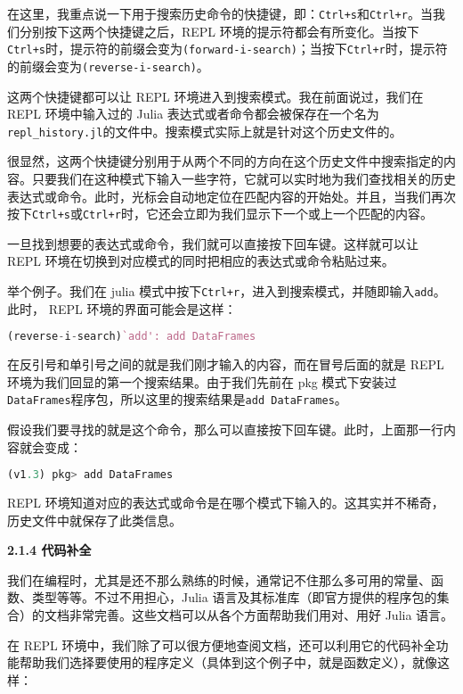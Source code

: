 在这里，我重点说一下用于搜索历史命令的快捷键，即：\verb`Ctrl+s`和\verb`Ctrl+r`。当我们分别按下这两个快捷键之后，REPL 环境的提示符都会有所变化。当按下\verb`Ctrl+s`时，提示符的前缀会变为\verb`(forward-i-search)`；当按下\verb`Ctrl+r`时，提示符的前缀会变为\verb`(reverse-i-search)`。

这两个快捷键都可以让 REPL 环境进入到搜索模式。我在前面说过，我们在 REPL 环境中输入过的 Julia 表达式或者命令都会被保存在一个名为\verb`repl_history.jl`的文件中。搜索模式实际上就是针对这个历史文件的。

很显然，这两个快捷键分别用于从两个不同的方向在这个历史文件中搜索指定的内容。只要我们在这种模式下输入一些字符，它就可以实时地为我们查找相关的历史表达式或命令。此时，光标会自动地定位在匹配内容的开始处。并且，当我们再次按下\verb`Ctrl+s`或\verb`Ctrl+r`时，它还会立即为我们显示下一个或上一个匹配的内容。

一旦找到想要的表达式或命令，我们就可以直接按下回车键。这样就可以让 REPL 环境在切换到对应模式的同时把相应的表达式或命令粘贴过来。

举个例子。我们在 julia 模式中按下\verb`Ctrl+r`，进入到搜索模式，并随即输入\verb`add`。此时， REPL 环境的界面可能会是这样：

\begin{lstlisting}[language=julia]
(reverse-i-search)`add': add DataFrames
\end{lstlisting}

在反引号和单引号之间的就是我们刚才输入的内容，而在冒号后面的就是 REPL 环境为我们回显的第一个搜索结果。由于我们先前在 pkg 模式下安装过\verb`DataFrames`程序包，所以这里的搜索结果是\verb`add DataFrames`。

假设我们要寻找的就是这个命令，那么可以直接按下回车键。此时，上面那一行内容就会变成：

\begin{lstlisting}[language=julia]
(v1.3) pkg> add DataFrames
\end{lstlisting}

REPL 环境知道对应的表达式或命令是在哪个模式下输入的。这其实并不稀奇，历史文件中就保存了此类信息。

\textbf{2.1.4 代码补全}

我们在编程时，尤其是还不那么熟练的时候，通常记不住那么多可用的常量、函数、类型等等。不过不用担心，Julia 语言及其标准库（即官方提供的程序包的集合）的文档非常完善。这些文档可以从各个方面帮助我们用对、用好 Julia 语言。

在 REPL 环境中，我们除了可以很方便地查阅文档，还可以利用它的代码补全功能帮助我们选择要使用的程序定义（具体到这个例子中，就是函数定义），就像这样：

